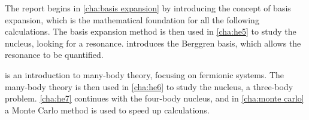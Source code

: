 

The report begins in \cref{cha:basis expansion} by introducing the concept of 
basis expansion, which is the mathematical foundation for all the
following calculations. The basis expansion method is then used in 
\cref{cha:he5} to study the  nucleus, looking for a resonance.
 introduces the Berggren basis, which
allows the resonance to be quantified.

 is an introduction to many-body theory, focusing 
on fermionic systems. The many-body theory is then used in \cref{cha:he6} 
to study the  nucleus, a three-body problem. \cref{cha:he7} 
continues with the four-body  nucleus, and in \cref{cha:monte carlo}
a Monte Carlo method is used to speed up calculations.
